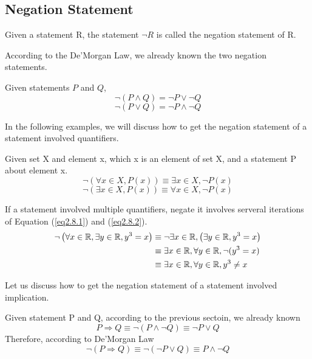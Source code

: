 \subsection{Negation Statement}
\begin{definition}
    Given a statement R, the statement $\neg R$ is called the negation statement of R. 
\end{definition}

According to the De'Morgan Law, we already known the two negation statements. 
\begin{example}
    Given statements $P$ and $Q$,
    \[
        \neg (P \wedge Q) = \neg P \vee \neg Q
    \]
    \[
            \neg (P \vee Q) = \neg P \wedge \neg Q
    \]
\end{example}

In the following examples, we will discuss how to get the negation statement of a statement involved quantifiers. 
\begin{example}
    Given set X and element x, which x is an element of set X, and a statement P about element x. 
    \begin{equation}
        \neg (\forall x \in X, P(x)) \equiv \exists x \in X, \neg P(x) \label{eq2.8.1}
    \end{equation}
    \begin{equation}
        \neg (\exists x \in X, P(x)) \equiv \forall x \in X, \neg P(x) \label{eq2.8.2}
    \end{equation}
    

    If a statement involved multiple quantifiers, negate it involves serveral iterations of Equation (\ref{eq2.8.1}) and (\ref{eq2.8.2}).
    \begin{align*}
        \neg \left(\forall x \in \mathbb{R}, \exists y \in \mathbb{R}, y^3 = x\right) &\equiv \neg \exists x \in \mathbb{R}, \left(\exists y \in \mathbb{R}, y^3 = x\right) \\
        &\equiv \exists x \in \mathbb{R}, \forall y \in \mathbb{R}, \neg(y^3 = x) \\
        &\equiv \exists x \in \mathbb{R}, \forall y \in \mathbb{R}, y^3 \neq x
    \end{align*}
\end{example}

Let us discuss how to get the negation statement of a statement involved implication.
\begin{example}
    Given statement P and Q, according to the previous sectoin, we already known
    \[
        P \Rightarrow Q \equiv \neg (P \wedge \neg Q) \equiv \neg P \vee Q
    \]
    Therefore, according to De'Morgan Law
    \[
        \neg \left(P \Rightarrow Q\right) \equiv \neg (\neg P \vee Q) \equiv P \wedge \neg Q
    \]
\end{example}